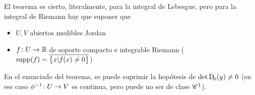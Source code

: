\begin{obs}
    El teorema es cierto, literalmente, para la integral de Lebesgue, pero para la integral de Riemann hay que suponer que
    \begin{itemize}
        \item $U,V$ abiertos medibles Jordan
        \item $f \colon U \to \mathbb{R}$ de soporte compacto e integrable Riemann ($\text{supp}(f) = \overline{\left\{x \vert f(x) \neq 0\right\}}$)
    \end{itemize}
\end{obs}

\begin{obs}
    En el enunciado del teorema, se puede suprimir la hopótesis de $\det \Dif_\phi(y) \neq 0$ (en ese caso $\phi^{-1} \colon U \to V$ es
    continua, pero puede no ser de clase $\mathscr{C}^1$).
\end{obs}

